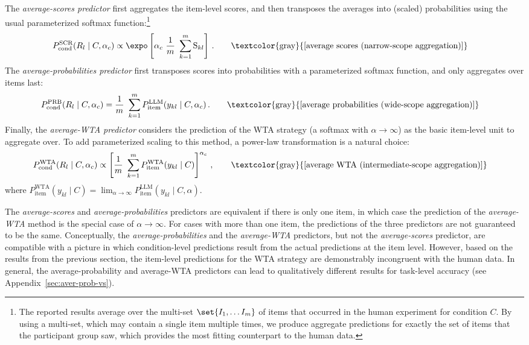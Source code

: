 \documentclass[fleqn]{article}
\begin{document}
The \emph{average-scores predictor} first aggregates the item-level scores, and then transposes the averages into (scaled) probabilities using the usual parameterized softmax function:\footnote{
  The reported results average over the multi-set \(\set{I_1, \dots I_m}\) of items that occurred in the human experiment for condition $C$.
  By using a multi-set, which may contain a single item multiple times, we produce aggregate predictions for exactly the set of items that the participant group saw, which provides the most fitting counterpart to the human data.}
%
\begin{align*}
  & P_{\text{cond}}^{\text{SCR}}(R_{l} \mid C, \alpha_{c})
    \propto \expo \left [  \alpha_{c} \ \frac{1}{m} \ \sum_{k=1}^{m} \text{S}_{kl}  \right ] \,.
    \tag*{\textcolor{gray}{[average scores (narrow-scope aggregation)]}}
\end{align*}
%
The \emph{average-probabilities predictor} first transposes scores into probabilities with a parameterized softmax function, and only aggregates over items last:
\begin{align*}
  & P_{\text{cond}}^{\text{PRB}}(R_{l} \mid C, \alpha_{c})
    = \frac{1}{m} \ \sum_{k=1}^{m} P_{\text{item}}^{\text{LLM}}(y_{kl} \mid C, \alpha_{c}) \,.
    \tag*{\textcolor{gray}{[average probabilities (wide-scope aggregation)]}}
\end{align*}
%
Finally, the \emph{average-WTA predictor} considers the prediction of the WTA strategy (a softmax with $\alpha \rightarrow \infty$) as the basic item-level unit to aggregate over.
To add parameterized scaling to this method, a power-law transformation is a natural choice:
\begin{align*}
  & P_{\text{cond}}^{\text{WTA}}(R_{l} \mid C, \alpha_{c})
    \propto  \left [ \frac{1}{m} \ \sum_{k=1}^{m} P_{\text{item}}^{\text{WTA}}(y_{kl} \mid C) \right ]^{\alpha_{c}}\,,
    \tag*{\textcolor{gray}{[average WTA (intermediate-scope aggregation)]}}
\end{align*}
where $P_{\text{item}}^{\text{WTA}}(y_{kl} \mid C) = \lim_{\alpha \rightarrow \infty} P_{\text{item}}^{\text{LLM}}(y_{kl} \mid C, \alpha)$.
\bigskip


The \emph{average-scores} and \emph{average-probabilities} predictors are equivalent if there is only one item, in which case the prediction of the \emph{average-WTA} method is the special case of $\alpha \rightarrow \infty$.
For cases with more than one item, the predictions of the three predictors are not guaranteed to be the same.
Conceptually, the \emph{average-probabilities} and the \emph{average-WTA} predictors, but not the \emph{average-scores} predictor, are compatible with a picture in which condition-level predictions result from the actual predictions at the item level.
However, based on the results from the previous section, the item-level predictions for the WTA strategy are demonstrably incongruent with the human data.
In general, the average-probability and average-WTA predictors can lead to qualitatively different results for task-level accuracy (see Appendix~\ref{sec:aver-prob-vs}).
\end{document}
